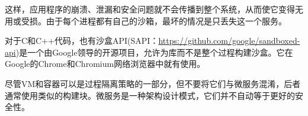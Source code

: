 这样，应用程序的崩溃、泄漏和安全问题就不会传播到整个系统，从而使它变得无用或受损。由于每个进程都有自己的沙箱，最坏的情况是只丢失这一个服务。

对于C和C++代码，也有沙盒API(SAPI：\url{https://github.com/google/sandboxed-api})是一个由Google领导的开源项目，允许为库而不是整个过程构建沙盒。它在Google的Chrome和Chromium网络浏览器中就有使用。

尽管VM和容器可以是过程隔离策略的一部分，但不要将它们与微服务混淆，后者通常使用类似的构建块。微服务是一种架构设计模式，它们并不自动等于更好的安全性。

















